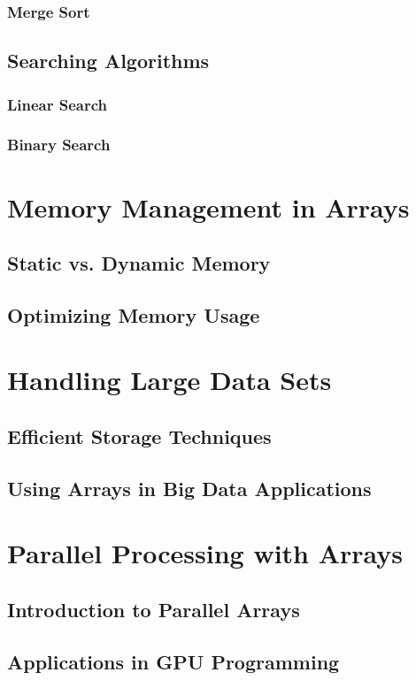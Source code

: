 \documentclass[12pt, oneside]{book}
\begin{document}
	\subsubsection{Merge Sort}
	\subsection{Searching Algorithms}
	\subsubsection{Linear Search}
	\subsubsection{Binary Search}
	
	\section{Memory Management in Arrays}
	\subsection{Static vs. Dynamic Memory}
	\subsection{Optimizing Memory Usage}
	
	\section{Handling Large Data Sets}
	\subsection{Efficient Storage Techniques}
	\subsection{Using Arrays in Big Data Applications}
	
	\section{Parallel Processing with Arrays}
	\subsection{Introduction to Parallel Arrays}
	\subsection{Applications in GPU Programming}
	
\end{document}
